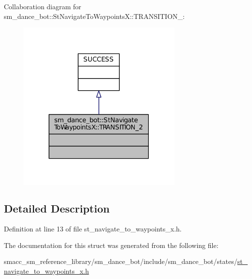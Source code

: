 Collaboration diagram for sm\+\_\+dance\+\_\+bot\+:\+:St\+Navigate\+To\+WaypointsX\+:\+:T\+R\+A\+N\+S\+I\+T\+I\+O\+N\+\_\+:
\nopagebreak
\begin{figure}[H]
\begin{center}
\leavevmode
\includegraphics[width=234pt]{structsm__dance__bot_1_1StNavigateToWaypointsX_1_1TRANSITION__2__coll__graph}
\end{center}
\end{figure}


\subsection{Detailed Description}


Definition at line 13 of file st\+\_\+navigate\+\_\+to\+\_\+waypoints\+\_\+x.\+h.



The documentation for this struct was generated from the following file\+:\begin{DoxyCompactItemize}
\item 
smacc\+\_\+sm\+\_\+reference\+\_\+library/sm\+\_\+dance\+\_\+bot/include/sm\+\_\+dance\+\_\+bot/states/\hyperlink{st__navigate__to__waypoints__x_8h}{st\+\_\+navigate\+\_\+to\+\_\+waypoints\+\_\+x.\+h}\end{DoxyCompactItemize}
